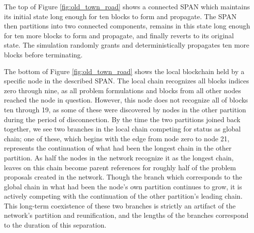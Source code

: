 The top of Figure \ref{fig:old_town_road} shows a connected SPAN which maintains
its initial state long enough for ten blocks to form and propagate. The SPAN
then partitions into two connected components, remains in this state long enough for
ten more blocks to form and propagate, and finally reverts to its original state.
The simulation randomly grants and deterministically propagates ten more blocks before
terminating.

The bottom of Figure \ref{fig:old_town_road} shows the local blockchain held by a
specific node in the described SPAN. The local chain recognizes all blocks indices
zero through nine, as all problem formulations and blocks from all other nodes
reached the node in question. However, this node does not recognize all of blocks ten
through 19, as some of these were discovered by nodes in the other partition during the
period of disconnection. By the time the two partitions joined back together, we see two
branches in the local chain competing for status as global chain; one of these, which
begins with the edge from node zero to node 21, represents the continuation of what had
been the longest chain in the other partition. As half the nodes in the network recognize
it as the longest chain, leaves on this chain become parent references for roughly half
of the problem proposals created in the network. Though the branch which corresponds to
the global chain in what had been the node's own partition continues to grow, it is
actively competing with the continuation of the other partition's leading chain. This
long-term coexistence of these two branches is strictly an artifact of the network's
partition and reunification, and the lengths of the branches correspond to the duration
of this separation.

